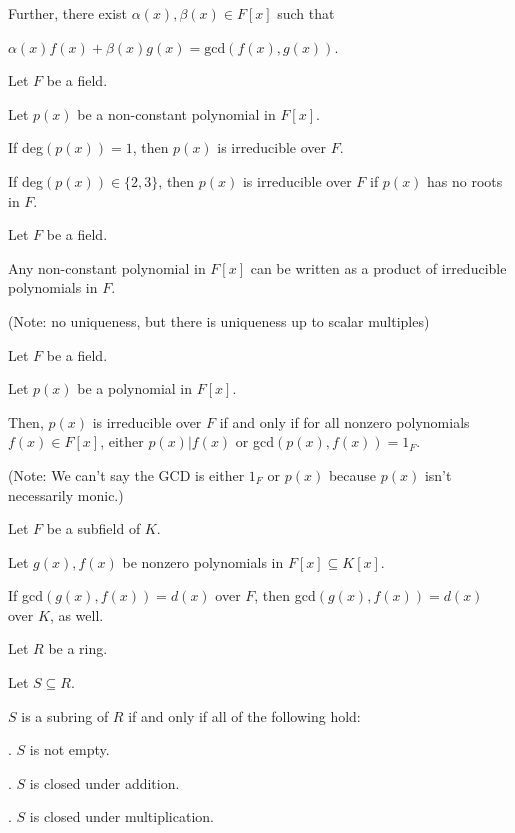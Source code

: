 \documentclass{article}
\begin{document}
Further, there exist $\alpha(x),\beta(x)\in F[x]$ such that 

\indent\indent$\alpha(x)f(x)+\beta(x)g(x)=\text{gcd}(f(x),g(x))$.


Let $F$ be a field.

Let $p(x)$ be a non-constant polynomial in $F[x]$.

If deg$(p(x))=1$, then $p(x)$ is irreducible over $F$.

If deg$(p(x)) \in \{2,3\}$, then $p(x)$ is irreducible over $F$ if $p(x)$ has no roots in $F$.


Let $F$ be a field.

Any non-constant polynomial in $F[x]$ can be written as a product of irreducible polynomials in $F$.

(Note: no uniqueness, but there is uniqueness up to scalar multiples)


Let $F$ be a field.

Let $p(x)$ be a polynomial in $F[x]$.

Then, $p(x)$ is irreducible over $F$ if and only if for all nonzero polynomials $f(x)\in F[x]$, either $p(x)|f(x)$ or gcd$(p(x),f(x))=1_F$.

(Note: We can't say the GCD is either $1_F$ or $p(x)$ because $p(x)$ isn't necessarily monic.)


Let $F$ be a subfield of $K$.

Let $g(x),f(x)$ be nonzero polynomials in $F[x]\subseteq K[x]$.

If gcd$(g(x),f(x))=d(x)$ over $F$, then gcd$(g(x),f(x))=d(x)$ over $K$, as well.

\newpage


    Let $R$ be a ring.
    
    Let $S\subseteq R$.
    
    $S$ is a subring of $R$ if and only if all of the following hold:
    
    \indent{}. $S$ is not empty.
    
    \indent{}. $S$ is closed under addition.
    
    \indent{}. $S$ is closed under multiplication.
    
\end{document}

